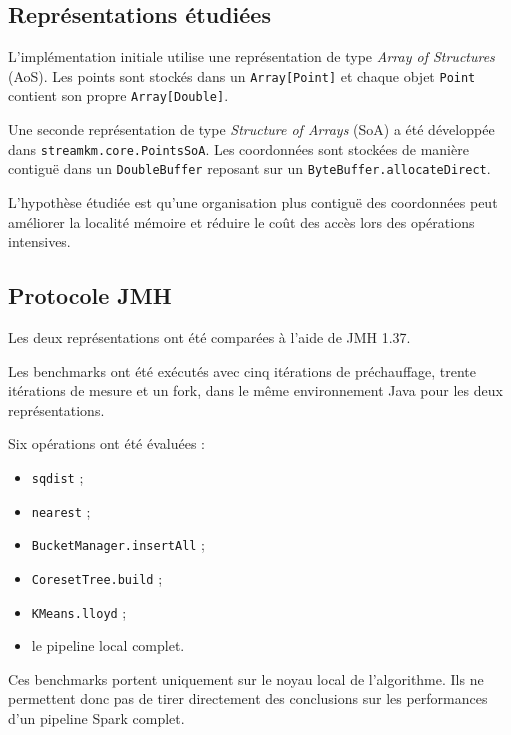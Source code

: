 \subsection{Représentations étudiées}

L'implémentation initiale utilise une représentation de type \emph{Array of Structures} (AoS). Les points sont stockés dans un \texttt{Array[Point]} et chaque objet \texttt{Point} contient son propre \texttt{Array[Double]}.

Une seconde représentation de type \emph{Structure of Arrays} (SoA) a été développée dans \texttt{streamkm.core.PointsSoA}. Les coordonnées sont stockées de manière contiguë dans un \texttt{DoubleBuffer} reposant sur un \texttt{ByteBuffer.allocateDirect}.

L'hypothèse étudiée est qu'une organisation plus contiguë des coordonnées peut améliorer la localité mémoire et réduire le coût des accès lors des opérations intensives.

\subsection{Protocole JMH}

Les deux représentations ont été comparées à l'aide de JMH 1.37.

Les benchmarks ont été exécutés avec cinq itérations de préchauffage, trente itérations de mesure et un fork, dans le même environnement Java pour les deux représentations.

Six opérations ont été évaluées :

\begin{itemize}
    \item \texttt{sqdist} ;
    \item \texttt{nearest} ;
    \item \texttt{BucketManager.insertAll} ;
    \item \texttt{CoresetTree.build} ;
    \item \texttt{KMeans.lloyd} ;
    \item le pipeline local complet.
\end{itemize}

Ces benchmarks portent uniquement sur le noyau local de l'algorithme. Ils ne permettent donc pas de tirer directement des conclusions sur les performances d'un pipeline Spark complet.

